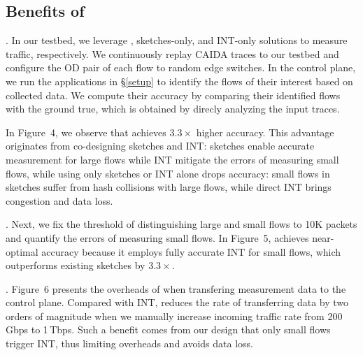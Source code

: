 \subsection{Benefits of \sysname}

. In our testbed, we leverage \sysname, sketches-only, and INT-only solutions to measure traffic, respectively. We continuously replay CAIDA traces \cite{caida} to our testbed and configure the OD pair of each flow to random edge switches. In the control plane, we run the applications in \S\ref{setup} to identify the flows of their interest based on collected data. We compute their accuracy by comparing their identified flows with the ground true, which is obtained by direcly analyzing the input traces. 


In Figure~4, we observe that \sysname achieves $3.3\times$ higher accuracy. This advantage originates from co-designing sketches and INT: sketches enable accurate measurement for large flows while INT mitigate the errors of measuring small flows, while using only sketches or INT alone drops accuracy: small flows in sketches suffer from hash collisions with large flows, while direct INT brings congestion and data loss. 

. Next, we fix the threshold of distinguishing large and small flows to 10K packets and quantify the errors of measuring small flows. In Figure~5, \sysname achieves near-optimal accuracy because it employs fully accurate INT for small flows, which outperforms existing sketches by $3.3\times$.  


. Figure~6 presents the overheads of \sysname when transfering measurement data to the control plane. Compared with INT, \sysname reduces the rate of transferring data by two orders of magnitude when we manually increase incoming traffic rate from 200\,Gbps to 1\,Tbps. Such a benefit comes from our design that only small flows trigger INT, thus limiting overheads and avoids data loss. 

